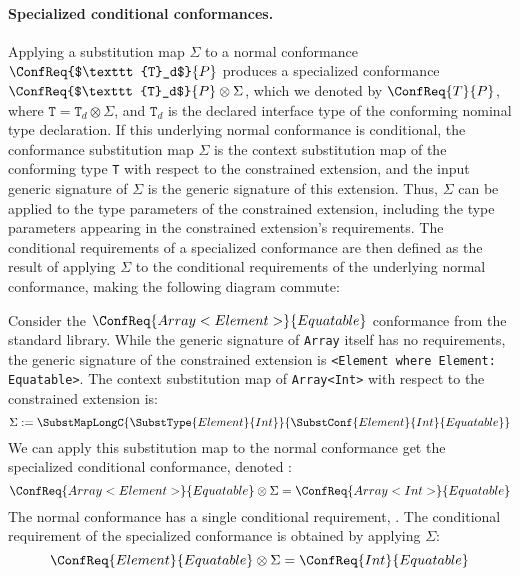 \documentclass[../generics]{subfiles}
\begin{document}
\paragraph{Specialized conditional conformances.}
Applying a substitution map $\Sigma$ to a normal conformance $\ConfReq{$\texttt{T}_d$}{P}$ produces a specialized conformance $\ConfReq{$\texttt{T}_d$}{P}\otimes\Sigma$, which we denoted by $\ConfReq{T}{P}$, where $\texttt{T}=\texttt{T}_d\otimes\Sigma$, and $\texttt{T}_d$ is the declared interface type of the conforming nominal type declaration. If this underlying normal conformance is conditional, the conformance substitution map $\Sigma$ is the context substitution map of the conforming type \texttt{T} with respect to the constrained extension, and the input generic signature of $\Sigma$ is the generic signature of this extension. Thus, $\Sigma$ can be applied to the type parameters of the constrained extension, including the type parameters appearing in the constrained extension's requirements. The conditional requirements of a specialized conformance are then defined as the result of applying $\Sigma$ to the conditional requirements of the underlying normal conformance, making the following diagram commute:
\begin{quote}
\newcommand{\GetConditionalRequirements}{\def\arraystretch{0.65}\arraycolsep=0pt\begin{array}{c}\text{get conditional}\\\text{requirements}\end{array}}
\end{quote}

Consider the $\ConfReq{Array<Element>}{Equatable}$ conformance from the standard library. While the generic signature of \texttt{Array} itself has no requirements, the generic signature of the constrained extension is \verb|<Element where Element: Equatable>|. The context substitution map of \texttt{Array<Int>} with respect to the constrained extension is:
\[\Sigma := \SubstMapLongC{\SubstType{Element}{Int}}{\SubstConf{Element}{Int}{Equatable}}\]
We can apply this substitution map to the normal conformance get the specialized conditional conformance, denoted :
\[
\ConfReq{Array<Element>}{Equatable} \otimes \Sigma = \ConfReq{Array<Int>}{Equatable}
\]
The normal conformance has a single conditional requirement, . The conditional requirement of the specialized conformance is obtained by applying $\Sigma$:
\[
\ConfReq{Element}{Equatable} \otimes \Sigma = \ConfReq{Int}{Equatable}
\]
\end{document}
